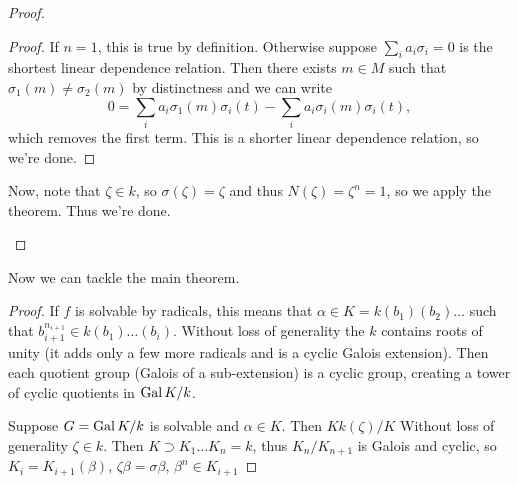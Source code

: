 \begin{theorem}
\begin{proof}
\begin{itemize}
\begin{theorem}
\begin{proof}
                    If $n = 1$, this is true by definition. Otherwise suppose $\sum_i a_i \sigma_i = 0$ is the shortest linear dependence relation.
                    Then there exists $m \in M$ such that $\sigma_1(m) \neq \sigma_2(m)$ by distinctness
                    and we can write
                    \[ 0 = \sum_i a_i \sigma_1(m) \sigma_i(t) - \sum_i a_i \sigma_i(m) \sigma_i(t), \]
                    which removes the first term.
                    This is a shorter linear dependence relation, so we're done.
                \end{proof}
            \end{theorem}
            Now, note that $\zeta \in k$, so $\sigma(\zeta) = \zeta$
            and thus $N(\zeta) = \zeta^n = 1$, so we apply the theorem. Thus we're done.
        \end{itemize}
    \end{proof}
\end{theorem}

Now we can tackle the main theorem.
\begin{proof}
    If $f$ is solvable by radicals, this means that $\alpha \in K = k(b_1)(b_2)\dots$ such that $b_{i + 1}^{n_{i + 1}} \in k(b_1)\dots(b_i)$.
    Without loss of generality the $k$ contains roots of unity (it adds only a few more radicals
    and is a cyclic Galois extension).
    Then each quotient group (Galois of a sub-extension) is a cyclic group, creating a tower of cyclic quotients in $\operatorname{Gal} K/k$.

    Suppose $G = \operatorname{Gal} K/k$ is solvable and $\alpha \in K$. Then $K k(\zeta)/K$ 
    Without loss of generality $\zeta \in k$. Then $K \supset K_1 \dots K_n = k$, thus $K_n/K_{n + 1}$ is Galois
    and cyclic, so $K_i = K_{i + 1}(\beta)$, $\zeta \beta = \sigma \beta$, $\beta^n \in K_{i + 1}$
\end{proof}